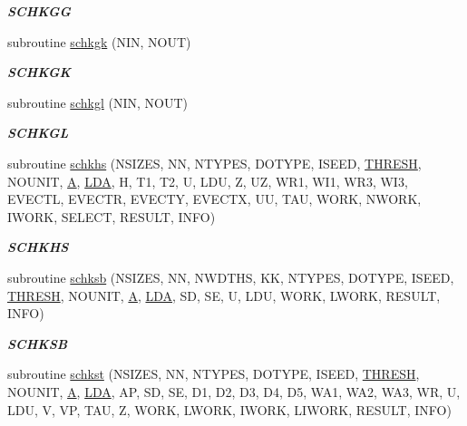 \begin{DoxyCompactItemize}
\begin{DoxyCompactList}\small\item\em {\bfseries S\+C\+H\+K\+G\+G} \end{DoxyCompactList}\item 
subroutine \hyperlink{group__single__eig_ga30cf9f83367d540b803fbd2b264dde8f}{schkgk} (N\+I\+N, N\+O\+U\+T)
\begin{DoxyCompactList}\small\item\em {\bfseries S\+C\+H\+K\+G\+K} \end{DoxyCompactList}\item 
subroutine \hyperlink{group__single__eig_gae4e43fee22351ea965e03ba9228aff5a}{schkgl} (N\+I\+N, N\+O\+U\+T)
\begin{DoxyCompactList}\small\item\em {\bfseries S\+C\+H\+K\+G\+L} \end{DoxyCompactList}\item 
subroutine \hyperlink{group__single__eig_gad6528d7acb91f950d1fae5bf68961251}{schkhs} (N\+S\+I\+Z\+E\+S, N\+N, N\+T\+Y\+P\+E\+S, D\+O\+T\+Y\+P\+E, I\+S\+E\+E\+D, \hyperlink{zlaqgs_8c_a0656018abfc9fa2821827415f5d5ea57}{T\+H\+R\+E\+S\+H}, N\+O\+U\+N\+I\+T, \hyperlink{classA}{A}, \hyperlink{example__user_8c_ae946da542ce0db94dced19b2ecefd1aa}{L\+D\+A}, H, T1, T2, U, L\+D\+U, Z, U\+Z, W\+R1, W\+I1, W\+R3, W\+I3, E\+V\+E\+C\+T\+L, E\+V\+E\+C\+T\+R, E\+V\+E\+C\+T\+Y, E\+V\+E\+C\+T\+X, U\+U, T\+A\+U, W\+O\+R\+K, N\+W\+O\+R\+K, I\+W\+O\+R\+K, S\+E\+L\+E\+C\+T, R\+E\+S\+U\+L\+T, I\+N\+F\+O)
\begin{DoxyCompactList}\small\item\em {\bfseries S\+C\+H\+K\+H\+S} \end{DoxyCompactList}\item 
subroutine \hyperlink{group__single__eig_gadbebec63ce21bd4a5e4f86e93fbfbd16}{schksb} (N\+S\+I\+Z\+E\+S, N\+N, N\+W\+D\+T\+H\+S, K\+K, N\+T\+Y\+P\+E\+S, D\+O\+T\+Y\+P\+E, I\+S\+E\+E\+D, \hyperlink{zlaqgs_8c_a0656018abfc9fa2821827415f5d5ea57}{T\+H\+R\+E\+S\+H}, N\+O\+U\+N\+I\+T, \hyperlink{classA}{A}, \hyperlink{example__user_8c_ae946da542ce0db94dced19b2ecefd1aa}{L\+D\+A}, S\+D, S\+E, U, L\+D\+U, W\+O\+R\+K, L\+W\+O\+R\+K, R\+E\+S\+U\+L\+T, I\+N\+F\+O)
\begin{DoxyCompactList}\small\item\em {\bfseries S\+C\+H\+K\+S\+B} \end{DoxyCompactList}\item 
subroutine \hyperlink{group__single__eig_ga78dcfb18a5c0e962c63effd1914f11a3}{schkst} (N\+S\+I\+Z\+E\+S, N\+N, N\+T\+Y\+P\+E\+S, D\+O\+T\+Y\+P\+E, I\+S\+E\+E\+D, \hyperlink{zlaqgs_8c_a0656018abfc9fa2821827415f5d5ea57}{T\+H\+R\+E\+S\+H}, N\+O\+U\+N\+I\+T, \hyperlink{classA}{A}, \hyperlink{example__user_8c_ae946da542ce0db94dced19b2ecefd1aa}{L\+D\+A}, A\+P, S\+D, S\+E, D1, D2, D3, D4, D5, W\+A1, W\+A2, W\+A3, W\+R, U, L\+D\+U, V, V\+P, T\+A\+U, Z, W\+O\+R\+K, L\+W\+O\+R\+K, I\+W\+O\+R\+K, L\+I\+W\+O\+R\+K, R\+E\+S\+U\+L\+T, I\+N\+F\+O)

\end{DoxyCompactItemize}
